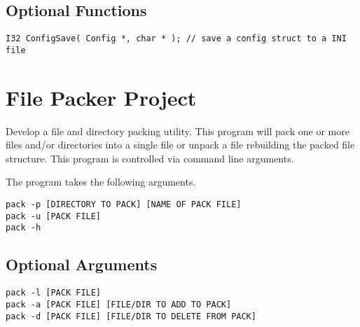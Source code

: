 \documentclass[a4paper,12pt]{report}
\begin{document}
\subsection*{Optional Functions}
\begin{lstlisting}
I32 ConfigSave( Config *, char * ); // save a config struct to a INI file
\end{lstlisting}

\pagebreak
\section*{File Packer Project}
Develop a file and directory packing utility.  This program will pack one or more files and/or directories into a single file or unpack a file rebuilding the packed file structure.  This program is controlled via command line arguments.

The program takes the following arguments.
\begin{lstlisting}
pack -p [DIRECTORY TO PACK] [NAME OF PACK FILE]
pack -u [PACK FILE]
pack -h
\end{lstlisting}

\subsection*{Optional Arguments}
\begin{lstlisting}
pack -l [PACK FILE]
pack -a [PACK FILE] [FILE/DIR TO ADD TO PACK]
pack -d [PACK FILE] [FILE/DIR TO DELETE FROM PACK]
\end{lstlisting}
\end{document}
